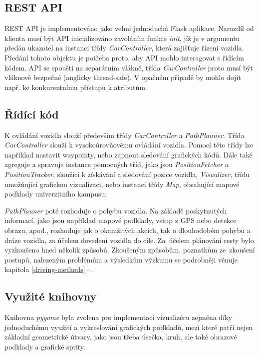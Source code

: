 \documentclass[czech, bachelor]{diploma}
\newcommand{\peteref}[1]{\ref{#1}\,--\,\nameref{#1}}
\begin{document}
\subsection{REST API}

REST API je implementováno jako velmi jednoduchá Flask aplikace. Narozdíl od klienta musí být API inicializováno zavoláním funkce
\emph{init}, jíž je v argumentu předán ukazatel na instanci třídy \emph{CarController}, která zajišťuje řízení vozidla. Předání
tohoto objektu je potřeba proto, aby API mohlo interagovat s řídícím kódem. API se spouští na separátním vlákně, třída
\emph{CarController} proto musí být vláknově bezpečné (anglicky thread-safe). V opačném případě by mohlo dojít např. ke 
konkurentnímu přístupu k atributům.

\subsection{Řídící kód}

K ovládání vozidla slouží především třídy \emph{CarController} a \emph{PathPlanner}. Třída \emph{CarController} slouží
k vysokoúrovňovému ovládání vozidla. Pomocí této třídy lze například nastavit waypointy, nebo zapnout sledování grafických kódů.
Dále také agreguje a spravuje instance pomocných tříd, jako jsou \emph{PositionFetcher} a \emph{PositionTracker}, sloužící
k získávání a sledování pozice vozidla, \emph{Visualizer}, třídu umožňující grafickou vizualizaci, nebo instanci třídy \emph{Map},
obsahující mapové podklady univerzitního kampusu.

\emph{PathPlanner} poté rozhoduje o pohybu vozidla. Na základě poskytnutých informací, jako jsou například mapové podklady, vstup
z GPS nebo detekce obrazu, apod., rozhoduje jak o okamžitých akcích, tak o dlouhodobém pohybu a dráze vozidla, za účelem dovedení
vozidla do cíle. Za~účelem plánování cesty bylo vyzkoušeno hned několik způsobů. Zkoušeným způsobům, poznatkům ze~zkoušení
postupů, nalezeným problémům a výsledkům výzkumu se podrobněji věnuje kapitola \peteref{driving-methods}.

\subsection{Využité knihovny}

Knihovna \emph{pygame} byla zvolena pro implementaci vizualizéru zejména díky jednoduchému využití a vykreslování grafických
podkladů, mezi které patří nejen základní geometrické útvary, jako jsou třeba úsečka, kruh, ale také obrazové podklady a grafické
sprity.
\end{document}
